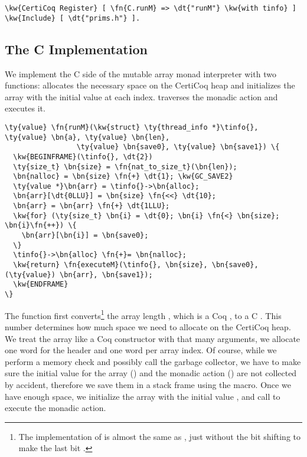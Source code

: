 \begin{Verbatim}
\kw{CertiCoq Register} [ \fn{C.runM} => \dt{"runM"} \kw{with tinfo} ] \kw{Include} [ \dt{"prims.h"} ].
\end{Verbatim}

\subsection{The C Implementation}

We implement the C side of the mutable array monad interpreter with two functions:  allocates the necessary space on the \gls{CertiCoq heap} and initializes the array with the initial value at each index.  traverses the monadic action and executes it.

\begin{Verbatim}
\ty{value} \fn{runM}(\kw{struct} \ty{thread_info *}\tinfo{}, \ty{value} \bn{a}, \ty{value} \bn{len},
                 \ty{value} \bn{save0}, \ty{value} \bn{save1}) \{
  \kw{BEGINFRAME}(\tinfo{}, \dt{2})
  \ty{size_t} \bn{size} = \fn{nat_to_size_t}(\bn{len});
  \bn{nalloc} = \bn{size} \fn{+} \dt{1}; \kw{GC_SAVE2}
  \ty{value *}\bn{arr} = \tinfo{}->\bn{alloc};
  \bn{arr}[\dt{0LLU}] = \bn{size} \fn{<<} \dt{10};
  \bn{arr} = \bn{arr} \fn{+} \dt{1LLU};
  \kw{for} (\ty{size_t} \bn{i} = \dt{0}; \bn{i} \fn{<} \bn{size}; \bn{i}\fn{++}) \{
    \bn{arr}[\bn{i}] = \bn{save0};
  \}
  \tinfo{}->\bn{alloc} \fn{+}= \bn{nalloc};
  \kw{return} \fn{executeM}(\tinfo{}, \bn{size}, \bn{save0}, (\ty{value}) \bn{arr}, \bn{save1});
  \kw{ENDFRAME}
\}
\end{Verbatim}

The function first converts\footnote{The implementation of  is almost the same as , just without the bit shifting to make the last bit .} the array length , which is a Coq , to a C . This number determines how much space we need to allocate on the \gls{CertiCoq heap}. We treat the array like a Coq constructor with that many arguments, we allocate one word for the header and one word per array index. Of course, while we perform a memory check and possibly call the garbage collector, we have to make sure the initial value for the array () and the monadic action () are not collected by accident, therefore we save them in a stack frame using the  macro.
Once we have enough space, we initialize the array with the initial value , and call  to execute the monadic action.

